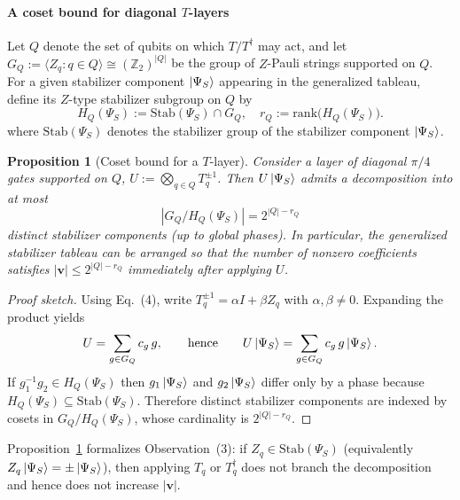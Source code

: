 \documentclass[10pt,conference]{IEEEtran}
\newtheorem{proposition}{Proposition}
\begin{document}
\paragraph{A coset bound for diagonal $T$-layers}
Let $Q$ denote the set of qubits on which $T/T^\dagger$ may act, and let
$G_Q := \langle Z_q : q\in Q\rangle \cong (\mathbb{Z}_2)^{|Q|}$
be the group of $Z$-Pauli strings supported on $Q$.
For a given stabilizer component $\ket{\Psi_S}$ appearing in the generalized tableau, define its $Z$-type stabilizer subgroup on $Q$ by
\begin{equation}
H_Q(\Psi_S) := \mathrm{Stab}(\Psi_S)\cap G_Q,
\quad r_Q := \mathrm{rank}\bigl(H_Q(\Psi_S)\bigr).
\end{equation}
where $\mathrm{Stab}(\Psi_S)$ denotes the stabilizer group of the stabilizer component $\ket{\Psi_S}$.

\begin{proposition}[Coset bound for a $T$-layer]\label{prop:coset_bound}
Consider a layer of diagonal $\pi/4$ gates supported on $Q$,
$U := \bigotimes_{q\in Q} T_q^{\pm 1}$.
Then $U\ket{\Psi_S}$ admits a decomposition into at most
\begin{equation}
|G_Q/H_Q(\Psi_S)| = 2^{|Q|-r_Q}
\end{equation}
distinct stabilizer components (up to global phases). In particular, the generalized stabilizer tableau can be arranged so that the number of nonzero coefficients satisfies $|\mathbf{v}|\le 2^{|Q|-r_Q}$ immediately after applying $U$.
\end{proposition}

\begin{proof}[Proof sketch]
Using Eq.~(4), write $T_q^{\pm 1}=\alpha I+\beta Z_q$ with $\alpha,\beta\neq 0$.
Expanding the product yields
\[
U = \sum_{g\in G_Q} c_g\, g,
\qquad\text{hence}\qquad
U\ket{\Psi_S}=\sum_{g\in G_Q} c_g\, g\ket{\Psi_S}.
\]
If $g_1^{-1}g_2\in H_Q(\Psi_S)$ then $g_1\ket{\Psi_S}$ and $g_2\ket{\Psi_S}$ differ only by a phase because $H_Q(\Psi_S)\subseteq \mathrm{Stab}(\Psi_S)$.
Therefore distinct stabilizer components are indexed by cosets in $G_Q/H_Q(\Psi_S)$, whose cardinality is $2^{|Q|-r_Q}$.
\end{proof}

Proposition~\ref{prop:coset_bound} formalizes Observation~(3): if $Z_q\in \mathrm{Stab}(\Psi_S)$ (equivalently $Z_q\ket{\Psi_S}=\pm\ket{\Psi_S}$), then applying $T_q$ or $T_q^\dagger$ does not branch the decomposition and hence does not increase $|\mathbf{v}|$.
\end{document}

